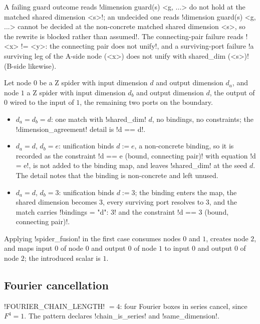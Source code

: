 A failing guard outcome reads \code!dimension guard(s) <g, ...> do not hold at the matched shared dimension <s>!;
an undecided one reads \code!dimension guard(s) <g, ...> cannot be decided at the non-concrete matched shared dimension <s>, so the rewrite is blocked rather than assumed!.
The connecting-pair failure reads \code!<x> != <y>: the connecting pair does not unify!, and a
surviving-port failure \code!a surviving leg of the A-side node (<x>) does not unify with shared_dim (<s>)! (B-side likewise).

\begin{example}\label{ex:rewriting-fusion}
Let node $0$ be a Z spider with input dimension $d$ and output dimension $d_a$, and node $1$ a Z
spider with input dimension $d_b$ and output dimension $d$, the output of $0$ wired to the input of
$1$, the remaining two ports on the boundary.
\begin{itemize}
\item $d_a = d_b = d$: one match with \py!shared_dim! $d$, no bindings, no constraints; the
  \code!dimension_agreement! detail is \code!d == d!.
\item $d_a = d$, $d_b = e$: unification binds $d := e$, a non-concrete binding, so it is recorded
  as the constraint \code!d == e (bound, connecting pair)! with equation \code!d = e!, is not added
  to the binding map, and leaves \py!shared_dim! at the seed $d$. The detail notes that the binding is
  non-concrete and left unused.
\item $d_a = d$, $d_b = 3$: unification binds $d := 3$; the binding enters the map, the shared
  dimension becomes $3$, every surviving port resolves to $3$, and the match carries
  \py!bindings = {"d": 3}! and the constraint \code!d == 3 (bound, connecting pair)!.
\end{itemize}
Applying \code!spider_fusion! in the first case consumes nodes $0$ and $1$, creates node $2$, and
maps input $0$ of node $0$ and output $0$ of node $1$ to input $0$ and output $0$ of node $2$; the
introduced scalar is $1$.
\end{example}

\subsection{Fourier cancellation}

\py!FOURIER_CHAIN_LENGTH! $=4$: four Fourier boxes in series cancel, since $F^4 = 1$. The pattern
declares \code!chain_is_series! and \code!same_dimension!.

